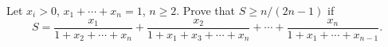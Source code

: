 Let $x_i > 0$, $x_1 + \cdots + x_n = 1$, $n \geq 2$. Prove that $S \geq n/(2n - 1)$ if
\[ S = \frac{x_1}{1 + x_2 + \cdots + x_n} + \frac{x_2}{1 + x_1 + x_3 + \cdots + x_n} + \cdots + \frac{x_n}{1 + x_1 + \cdots + x_{n-1}}. \]

